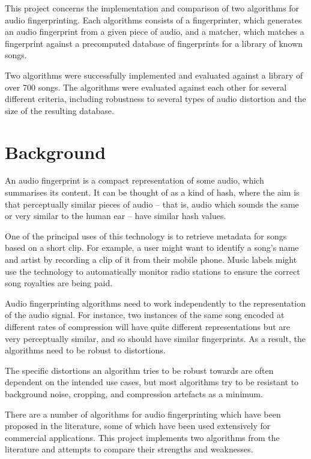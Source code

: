 \documentclass[12pt,a4paper,twoside,openright]{report}
\begin{document}
This project concerns the implementation and comparison of two algorithms for audio fingerprinting. Each algorithms consists of a fingerprinter, which generates an audio fingerprint from a given piece of audio, and a matcher, which matches a fingerprint against a precomputed database of fingerprints for a library of known songs.

Two algorithms were successfully implemented and evaluated against a library of over 700 songs. The algorithms were evaluated against each other for several different criteria, including robustness to several types of audio distortion and the size of the resulting database.


\section{Background}

An audio fingerprint is a compact representation of some audio, which summarises its content. It can be thought of as a kind of hash, where the aim is that perceptually similar pieces of audio -- that is, audio which sounds the same or very similar to the human ear -- have similar hash values.

One of the principal uses of this technology is to retrieve metadata for songs based on a short clip. For example, a user might want to identify a song's name and artist by recording a clip of it from their mobile phone. Music labels might use the technology to automatically monitor radio stations to ensure the correct song royalties are being paid.

Audio fingerprinting algorithms need to work independently to the representation of the audio signal. For instance, two instances of the same song encoded at different rates of compression will have quite different representations but are very perceptually similar, and so should have similar fingerprints. As a result, the algorithms need to be robust to distortions. 

The specific distortions an algorithm tries to be robust towards are often dependent on the intended use cases, but most algorithms try to be resistant to background noise, cropping, and compression artefacts as a minimum.

There are a number of algorithms for audio fingerprinting which have been proposed in the literature, some of which have been used extensively for commercial applications. This project implements two algorithms from the literature and attempts to compare their strengths and weaknesses.
\end{document}
